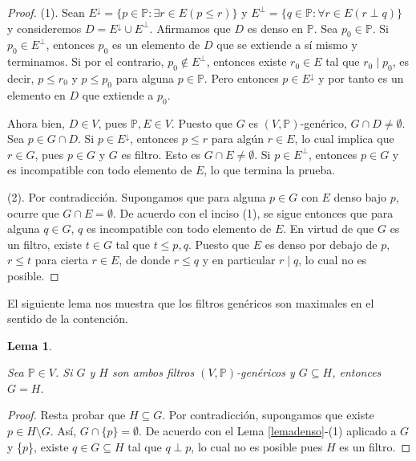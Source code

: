 \documentclass[11pt]{unam_tesis1}
\theoremstyle{MyThmStyle}
\theoremstyle{definition}
\theoremstyle{plain}
\newtheorem{lemma}[definition]{Lema}
\theoremstyle{remark}
\let\leq\leqslant
\begin{document}
\begin{proof}
(1). Sean $E^{\downarrow}=\{p\in \mathbb P: \exists r\in E(p\leq r) \}$ y $E^{\perp}=\{q\in \mathbb P:\forall r\in E(r\perp q) \}$ y consideremos $D=E^{\downarrow}\cup E^{\perp}$. Afirmamos que $D$ es denso en $\mathbb P$. Sea $p_0\in \mathbb P$. Si $p_0\in E^{\perp}$, entonces $p_0$ es un elemento de $D$ que se extiende a s\'i mismo y terminamos. Si por el contrario, $p_0\notin E^{\perp}$, entonces existe $r_0\in E$ tal que $r_0\mid p_0$, es decir, $p\leq r_0$ y $p\leq p_0$ para alguna $p\in \mathbb P$. Pero entonces $p\in E^{\downarrow}$ y por tanto es un elemento en $D$ que extiende a $p_0$.

Ahora bien, $D\in V$, pues $\mathbb P,E\in V$. Puesto que $G$ es $(V,\mathbb P)$-gen\'erico, $G\cap D\neq \emptyset$. Sea $p\in G\cap D$. Si $p\in E^{\downarrow}$, entonces $p\leq r$ para alg\'un $r\in E$, lo cual implica que $r\in G$, pues $p\in G$ y $G$ es filtro. Esto es $G\cap E\neq \emptyset$. Si $p\in E^{\perp}$, entonces $p\in G$ y es incompatible con todo elemento de $E$, lo que termina la prueba.

(2). Por contradicci\'on. Supongamos que para alguna $p\in G$ con $E$ denso bajo $p$, ocurre que $G\cap E=\emptyset$. De acuerdo con el inciso (1), se sigue entonces que para alguna $q\in G$, $q$ es incompatible con todo elemento de $E$. En virtud de que $G$ es un filtro, existe $t\in G$ tal que $t\leq p,q$. Puesto que $E$ es denso por debajo de $p$, $r\leq t$ para cierta $r\in E$, de donde $r\leq q$ y en particular $r\mid q$, lo cual no es posible.
\end{proof}

El siguiente lema nos muestra que los filtros gen\'ericos son maximales en el sentido de la contenci\'on.

\begin{lemma}\label{filtrosiguales}

Sea $\mathbb P\in V$. Si $G$ y $H$ son ambos filtros $(V,\mathbb P)$-gen\'ericos y $G\subseteq H$, entonces $G=H$.

\end{lemma}

\begin{proof}
Resta probar que $H\subseteq G$. Por contradicci\'on, supongamos que existe $p\in H\setminus G$. As\'i, $G\cap \{p\}=\emptyset$. De acuerdo con el Lema \ref{lemadenso}-(1) aplicado a $G$ y \{$p$\}, existe $q\in G\subseteq H$ tal que $q\perp p$, lo cual no es posible pues $H$ es un filtro.
\end{proof}
\end{document}
